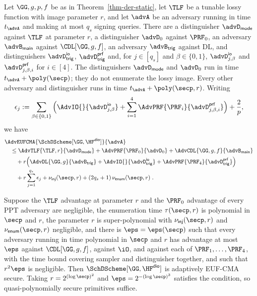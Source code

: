 \begin{theorem} \label{thm-der-adaptive}
Let $\GG,g,p,f$ be as in Theorem~\ref{thm-der-static}, let $\TLF$ be a tunable lossy function with image parameter $r$, and let $\advA$ be an adversary running in time $t_{\advA}$ and making at most $q_s$ signing queries. There are a distinguisher $\advD_{\mathsf{mode}}$ against $\TLF$ at parameter $r$, a distinguisher $\advD_0$ against $\PRF_0$, an adversary $\advB_{\mathsf{main}}$ against $\CDL[\GG,g,f]$, an adversary $\advB_{\mathsf{trig}}$ against DL, and distinguishers $\advD^{\mathsf{io}}_{\mathsf{trig}}$, $\advD^{\mathsf{prf}}_{\mathsf{trig}}$ and, for $j\in[q_s]$ and $\beta\in\{0,1\}$, $\advD^{\mathsf{io}}_{j,\beta}$ and $\advD^{\mathsf{prf}}_{j,\beta,i}$ for $i\in[4]$. The distinguishers $\advD_{\mathsf{mode}}$ and $\advD_0$ run in time $t_{\advA}+\poly(\secp)$; they do not enumerate the lossy image. Every other adversary and distinguisher runs in time $t_{\advA}+\poly(\secp,r)$. Writing
$$
\epsilon_j
:=
\sum_{\beta\in\{0,1\}}
\Big(
\AdvIO{}{\advD^{\mathsf{io}}_{j,\beta}}
+\sum_{i=1}^{4}\AdvPRF{\PRF_i}{\advD^{\mathsf{prf}}_{j,\beta,i}}
\Big)
+\frac{2}{p},
$$
we have
$$
\begin{aligned}
&\AdvEUFCMA{\SchDScheme[\GG,\HF^{\mathsf{dio}}]}{\advA}\\
&\quad\le
\AdvTLF{\TLF,r}{\advD_{\mathsf{mode}}}
+\AdvPRF{\PRF_0}{\advD_0}
+\AdvCDL{\GG,g,f}{\advB_{\mathsf{main}}}\\
&\qquad+r\Big(
\AdvDL{\GG,g}{\advB_{\mathsf{trig}}}
+\AdvIO{}{\advD^{\mathsf{io}}_{\mathsf{trig}}}
+\AdvPRF{\PRF_4}{\advD^{\mathsf{prf}}_{\mathsf{trig}}}
\Big)\\
&\qquad+r\sum_{j=1}^{q_s}\epsilon_j
+\nu_{\mathsf{inj}}(\secp,r)
+(2q_s+1)\,\nu_{\mathsf{enum}}(\secp,r) \;.
\end{aligned}
$$
\end{theorem}

\begin{corollary} \label{cor-der-adaptive}
Suppose the $\TLF$ advantage at parameter $r$ and the $\PRF_0$ advantage of every PPT adversary are negligible, the enumeration time $\tau(\secp,r)$ is polynomial in $\secp$ and $r$, the parameter $r$ is super-polynomial with $\nu_{\mathsf{inj}}(\secp,r)$ and $\nu_{\mathsf{enum}}(\secp,r)$ negligible, and there is $\eps=\eps(\secp)$ such that every adversary running in time polynomial in $\secp$ and $r$ has advantage at most $\eps$ against $\CDL[\GG,g,f]$, against $\iO$, and against each of $\PRF_1,\ldots,\PRF_4$, with the time bound covering sampler and distinguisher together, and such that $r^2\eps$ is negligible. Then $\SchDScheme[\GG,\HF^{\mathsf{dio}}]$ is adaptively EUF-CMA secure. Taking $r=2^{(\log\secp)^2}$ and $\eps=2^{-(\log\secp)^3}$ satisfies the condition, so quasi-polynomially secure primitives suffice.
\end{corollary}

